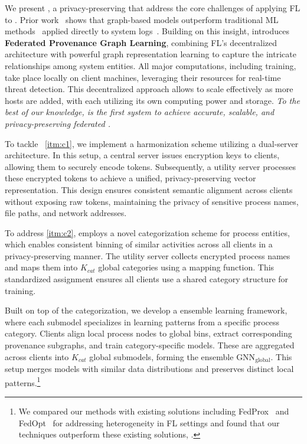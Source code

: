 \smallskip
{}
\smallskip

\noindent
We present \Sys, a privacy-preserving \pids that address the core challenges of applying FL to \pids. Prior work~\cite{wang2022threatrace} shows that graph-based models outperform traditional ML methods~\cite{chowdhary2020natural, goodfellow2020generative} applied directly to system logs~\cite{deeplog2017, xia2019loggan}. Building on this insight, \Sys introduces {\bf Federated Provenance Graph Learning}, combining FL’s decentralized architecture with powerful graph representation learning to capture the intricate relationships among system entities. All major computations, including training, take place locally on client machines, leveraging their resources for real-time threat detection. This decentralized approach allows \Sys to scale effectively as more hosts are added, with each utilizing its own computing power and storage.  {\it To the best of our knowledge, \Sys is the first system to achieve accurate, scalable, and privacy-preserving federated \pids.}

 To tackle ~\ref{itm:c1}, we implement a \wordvec harmonization scheme utilizing a dual-server architecture. In this setup, a central server issues encryption keys to clients, allowing them to securely encode \wordvec tokens. Subsequently, a utility server processes these encrypted tokens to achieve a unified, privacy-preserving vector representation. This design ensures consistent semantic alignment across clients without exposing raw tokens, maintaining the privacy of sensitive process names, file paths, and network addresses.

To address \ref{itm:c2}, \Sys employs a novel categorization scheme for process entities, which enables consistent binning of similar activities across all clients in a privacy-preserving manner. The utility server collects encrypted process names and maps them into
 \( K_{cat} \) global categories using a mapping function. This standardized assignment ensures all clients use a shared category structure for training.

 Built on top of the categorization, we develop a \gnnshort ensemble learning framework, where each submodel specializes in learning patterns from a specific process category. Clients align local process nodes to global bins, extract corresponding provenance subgraphs, and train category-specific models. These are aggregated across clients into \( K_{cat} \) global submodels, forming the ensemble \( \text{GNN}_{\text{global}} \). This setup merges models with similar data distributions and preserves distinct local patterns.\footnote{We compared our methods with existing solutions including FedProx~\cite{li2020federated} and FedOpt~\cite{asad2020fedopt} for addressing heterogeneity in FL settings and found that our techniques outperform these existing solutions, .}

